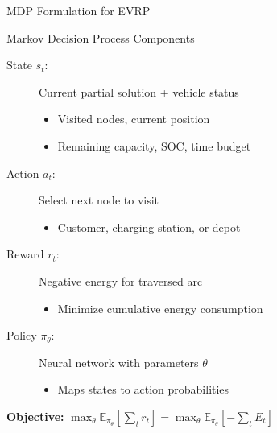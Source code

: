 \documentclass[aspectratio=169,11pt]{beamer}
\begin{document}
\begin{frame}{MDP Formulation for EVRP}
    \begin{block}{Markov Decision Process Components}
        \begin{description}
            \item[State $s_t$:] Current partial solution + vehicle status
                \begin{itemize}
                    \item Visited nodes, current position
                    \item Remaining capacity, SOC, time budget
                \end{itemize}
            \item[Action $a_t$:] Select next node to visit
                \begin{itemize}
                    \item Customer, charging station, or depot
                \end{itemize}
            \item[Reward $r_t$:] Negative energy for traversed arc
                \begin{itemize}
                    \item Minimize cumulative energy consumption
                \end{itemize}
            \item[Policy $\pi_\theta$:] Neural network with parameters $\theta$
                \begin{itemize}
                    \item Maps states to action probabilities
                \end{itemize}
        \end{description}
    \end{block}
    
    \vspace{0.3cm}
    \begin{center}
        \textbf{Objective:} $\max_\theta \mathbb{E}_{\pi_\theta}\left[\sum_t r_t\right] = \max_\theta \mathbb{E}_{\pi_\theta}\left[-\sum_t E_t\right]$
    \end{center}
\end{frame}
\end{document}
